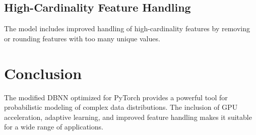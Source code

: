 \documentclass{article}
\begin{document}
\subsection{High-Cardinality Feature Handling}
The model includes improved handling of high-cardinality features by removing or rounding features with too many unique values.

\section{Conclusion}
The modified DBNN optimized for PyTorch provides a powerful tool for probabilistic modeling of complex data distributions. The inclusion of GPU acceleration, adaptive learning, and improved feature handling makes it suitable for a wide range of applications.
\end{document}
